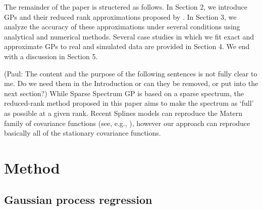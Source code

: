 \documentclass[]{interact}
\theoremstyle{plain}%
\theoremstyle{definition}
\theoremstyle{remark}
\begin{document}
The remainder of the paper is structered as follows. In Section 2, we introduce GPs and their reduced rank approximations proposed by \cite{solin2018hilbert}. In Section 3, we analyze the accuracy of these approximations under several conditions using analytical and numerical methods. Several case studies in which we fit
exact and approximate GPs to real and simulated data are provided in Section 4. We end with a discussion in Section 5.

(Paul: The content and the purpose of the following sentences is not fully clear to me. Do we need them in the Introduction or can they be removed, or put into the next section?) While Sparse Spectrum GP is based on a sparse spectrum, the reduced-rank method proposed in this paper aims to make the spectrum as ‘full’ as possible at a given rank. Recent Splines models can reproduce the Matern family of covariance functions (see, e.g., \cite{wood2003thin}), however our approach can reproduce basically all of the stationary covariance functions.

\vspace{3mm}
\section{Method}\label{sec:bf_method}

\subsection{Gaussian process regression}
\end{document}
